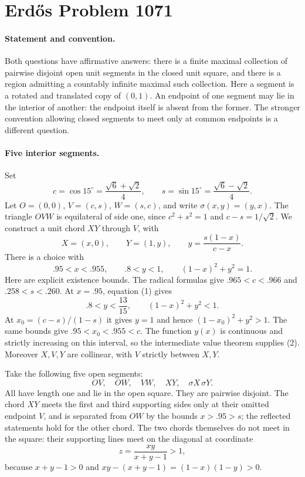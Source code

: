 \section*{Erd\H{o}s Problem 1071}

\paragraph{Statement and convention.}
Both questions have affirmative answers: there is a finite maximal collection of pairwise disjoint open unit segments in the closed unit square, and there is a region admitting a countably infinite maximal such collection. Here a segment is a rotated and translated copy of \((0,1)\). An endpoint of one segment may lie in the interior of another: the endpoint itself is absent from the former. The stronger convention allowing closed segments to meet only at common endpoints is a different question.

\paragraph{Five interior segments.}
Set
\[
 c=\cos15^\circ=\frac{\sqrt6+\sqrt2}{4},\qquad
 s=\sin15^\circ=\frac{\sqrt6-\sqrt2}{4}.
\]
Let \(O=(0,0)\), \(V=(c,s)\), \(W=(s,c)\), and write
\(\sigma(x,y)=(y,x)\). The triangle \(OVW\) is equilateral of side one, since \(c^2+s^2=1\) and \(c-s=1/\sqrt2\).
We construct a unit chord \(XY\) through \(V\), with
\[
 X=(x,0),\qquad Y=(1,y),\qquad
 y=\frac{s(1-x)}{c-x}.
 \tag{1}
\]
There is a choice with
\[
 .95<x<.955,\qquad .8<y<1,\qquad (1-x)^2+y^2=1.
 \tag{2}
\]
Here are explicit existence bounds. The radical formulas give
\(.965<c<.966\) and \(.258<s<.260\). At \(x=.95\), equation (1) gives
\[
 .8<y<\frac{13}{15},
 \qquad (1-x)^2+y^2<1.
\]
At \(x_0=(c-s)/(1-s)\) it gives \(y=1\) and hence
\((1-x_0)^2+y^2>1\). The same bounds give
\(.95<x_0<.955<c\). The function \(y(x)\) is continuous and strictly increasing on this interval, so the intermediate value theorem supplies (2). Moreover \(X,V,Y\) are collinear, with \(V\) strictly between \(X,Y\).

Take the following five open segments:
\[
 OV,\quad OW,\quad VW,\quad XY,\quad \sigma X\,\sigma Y.
 \tag{3}
\]
All have length one and lie in the open square. They are pairwise disjoint. The chord \(XY\) meets the first and third supporting sides only at their omitted endpoint \(V\), and is separated from \(OW\) by the bounds \(x>.95>s\); the reflected statements hold for the other chord. The two chords themselves do not meet in the square: their supporting lines meet on the diagonal at coordinate
\[
 z=\frac{xy}{x+y-1}>1,
\]
because \(x+y-1>0\) and \(xy-(x+y-1)=(1-x)(1-y)>0\).

